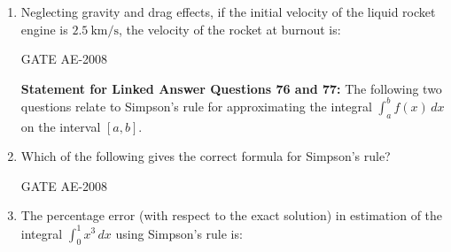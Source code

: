 \documentclass[journal,12pt,onecolumn]{IEEEtran}
\theoremstyle{remark}
\begin{document}
\begin{enumerate}
\quad 

\item Neglecting gravity and drag effects, if the initial velocity of the liquid rocket engine is $2.5 \ \text{km/s}$, the velocity of the rocket at burnout is:  \\

\begin{enumerate}
\end{enumerate}
\hfill{GATE AE-2008}

\quad 

\textbf{Statement for Linked Answer Questions 76 and 77:} 
The following two questions relate to Simpson's rule for approximating the integral  
$\int_a^b f(x) \, dx$ on the interval $[a, b]$.\\

\item Which of the following gives the correct formula for Simpson's rule? \\ 

\begin{enumerate}
\end{enumerate}
\hfill{GATE AE-2008}

\quad 

\item The percentage error (with respect to the exact solution) in estimation of the integral  
$\int_{0}^{1} x^3 \, dx$ using Simpson's rule is:  \\


\end{enumerate}
\end{document}
